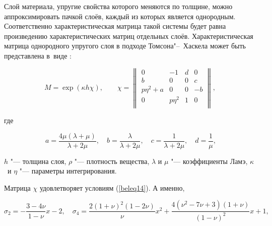 \begin{example}Слой материала, упругие свойства которого меняются по толщине,  можно аппроксимировать пачкой слоёв, каждый из которых является однородным. Соответственно характеристическая матрица такой системы будет равна произведению характеристических матриц отдельных слоёв. Характеристическая матрица однородного упругого слоя в подходе Томсона"--~Хаскела  может быть представлена в~виде \cite{belyayev:Molotkov}:

\begin{equation*}

M=\exp(\kappa h\chi),	

\qquad 

\chi=\begin{Vmatrix}

0 & -1 & d & 0\\

b & 0 & 0 & c\\

p\eta^2+a & 0 & 0 & -b\\

0 & p\eta^2 & 1 & 0\\

\end{Vmatrix},\ 

\end{equation*}

где

$$

a=\frac{4\mu(\lambda+\mu)}{\lambda+2\mu},\quad 

b=\frac{\lambda}{\lambda+2\mu},\quad 

c=\frac{1}{\lambda+2\mu},\quad 

d=\frac{1}{\mu},

$$

$h$ "--- толщина слоя, $\rho$ "--- плотность вещества, $\lambda$ и $\mu$ "--- коэффициенты Ламэ, $\kappa$~и $\eta$ "--- параметры интегрирования.



Матрица $\chi$ удовлетворяет условиям (\ref{beleq14}). А именно,

\begin{equation*}

\sigma_2=-\frac{3 - 4\nu}{1 - \nu}x - 2,\quad  	

\sigma_4=\frac{2(1 + \nu)^2(1 - 2\nu)}{\nu}x^2+\frac{4(\nu^2 - 7\nu + 3)(1 + \nu)}{(1 - \nu)^2}x+1,	

\end{equation*}


\end{example}
